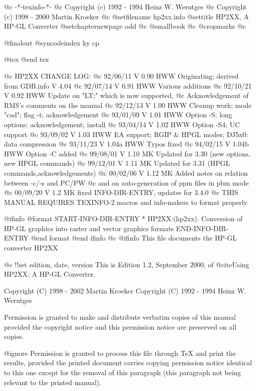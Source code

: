       @c -*-texinfo-*-
@c Copyright (c) 1992 - 1994  Heinz W. Werntges
@c Copyright (c) 1998 - 2000  Martin Kroeker
@c %
@setfilename hp2xx.info
@settitle HP2XX, A HP-GL Converter
@setchapternewpage odd
@c @smallbook
@c @cropmarks
@c %

@finalout
@syncodeindex ky cp

@tex
\xdef\manvers{$Revision: 1.2 $}  %
@end tex

@c HP2XX CHANGE LOG:
@c 92/06/11  V 0.90  HWW  Originating; derived from GDB.info V 4.04
@c 92/07/14  V 0.91  HWW  Various additions
@c 92/10/21  V 0.92  HWW  Update on "LT;" which is now supported,
@c                        Acknowledgement of RMS's comments on the manual
@c 92/12/13  V 1.00  HWW  Cleanup work; mode "cad"; flag -t; acknowledgement
@c 93/01/09  V 1.01  HWW  Option -S; long options; acknowledgement; install
@c 93/04/14  V 1.02  HWW  Option -S4; UC support
@c 93/09/02  V 1.03  HWW  EA support; RGIP & HPGL modes; DJ5x0: data compression
@c 93/11/23  V 1.04a HWW  Typos fixed
@c 94/02/15  V 1.04b HWW  Option -C added
@c 99/08/01  V 1.10  MK   Updated for 3.30 (new options, new HPGL commands)
@c 99/12/01  V 1.11  MK   Updated for 3.31 (HPGL commands,acknowledgements)
@c 00/02/06  V 1.12  MK   Added notes on relation between -c/-s and PC/PW
@c                        and on auto-generation of ppm files in pbm mode
@c 00/09/20  V 1.2   MK   fixed INFO-DIR-ENTRY, updates for 3.4.0
@c THIS MANUAL REQUIRES TEXINFO-2 macros and info-makers to format properly.

@ifinfo
@format
START-INFO-DIR-ENTRY
* HP2XX:(hp2xx).  Conversion of HP-GL graphics into raster and
                  vector graphics formats
END-INFO-DIR-ENTRY
@end format
@end ifinfo
@c
@ifinfo
This file documents the HP-GL converter HP2XX

@c !!set edition, date, version
This is Edition 1.2, September 2000,
of @cite{Using HP2XX: A HP-GL Converter}.

Copyright (C) 1998 - 2002 Martin Kroeker
Copyright (C) 1992 - 1994 Heinz W. Werntges

Permission is granted to make and distribute verbatim copies of
this manual provided the copyright notice and this permission notice
are preserved on all copies.

@ignore
Permission is granted to process this file through TeX and print the
results, provided the printed document carries copying permission
notice identical to this one except for the removal of this paragraph
(this paragraph not being relevant to the printed manual).

